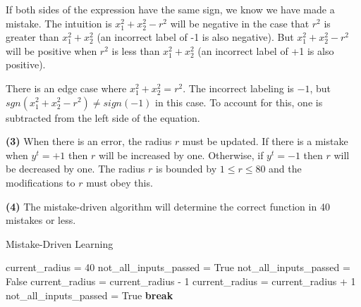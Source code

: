 \documentclass[11pt]{article}
\renewcommand\part[1]{\vspace{.10in}\textbf{(#1)}}
\begin{document}

If both sides of the expression have the same sign, we know we have made a mistake. The intuition is $x_1^2 + x_2^2 - r^2$ will be negative in the case that $r^2$ is greater than $x_1^2 + x_2^2$ (an incorrect label of -1 is also negative). But $x_1^2 + x_2^2 - r^2$ will be positive when $r^2$ is less than $x_1^2 + x_2^2$ (an incorrect label of +1 is also positive). 

There is an edge case where $x_1^2 + x_2^2 = r^2$. The incorrect labeling is $-1$, but $sgn(x_1^2 + x_2^2 - r^2) \neq sign(-1)$ in this case. To account for this, one is subtracted from the left side of the equation. 

\part{3} When there is an error, the radius $r$ must be updated. If there is a mistake when $y^t = +1$ then $r$ will be increased by one. Otherwise, if $y^t = -1$ then $r$ will be decreased by one. The radius $r$ is bounded by $1 \leq r \leq 80$ and the modifications to $r$ must obey this. 



\part{4} The mistake-driven algorithm will determine the correct function in 40 mistakes or less.

\begin{algorithm}[H]
\caption{Mistake-Driven Learning}
\label{CHalgorithm}
\begin{algorithmic}[1]
\State current\_radius = 40
\State not\_all\_inputs\_passed = True
\State not\_all\_inputs\_passed = False
\State current\_radius = current\_radius - 1
\Else{}
\State current\_radius = current\_radius + 1
\EndIf
\State not\_all\_inputs\_passed = True
\State \textbf{break}
\EndIf
\EndFor
\EndWhile
\EndProcedure
\end{algorithmic}
\end{algorithm}
\end{document}
